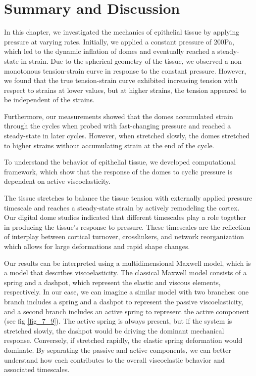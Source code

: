 \newpage
\hypertarget{summary}{%
	\section{Summary and Discussion}\label{summary}}

In this chapter, we investigated the mechanics of epithelial tissue by applying pressure at varying rates. Initially, we applied a constant pressure of 200Pa, which led to the dynamic inflation of domes and eventually reached a steady-state in strain. Due to the spherical geometry of the tissue, we observed a non-monotonous tension-strain curve in response to the constant pressure. However, we found that the true tension-strain curve exhibited increasing tension with respect to strains at lower values, but at higher strains, the tension appeared to be independent of the strains.

Furthermore, our measurements showed that the domes accumulated strain through the cycles when probed with fast-changing pressure and reached a steady-state in later cycles. However, when stretched slowly, the domes stretched to higher strains without accumulating strain at the end of the cycle.

To understand the behavior of epithelial tissue, we developed computational framework, which show that the response of the domes to cyclic pressure is dependent on active viscoelasticity.

The tissue stretches to balance the tissue tension with externally applied pressure timescale and reaches a steady-state strain by actively remodeling the cortex. Our digital dome studies indicated that different timescales play a role together in producing the tissue’s response to pressure. These timescales are the reflection of interplay between cortical turnover, crosslinkers, and network reorganization which allows for large deformations and rapid shape changes.

Our results can be interpreted using a multidimensional Maxwell model, which is a model that describes viscoelasticity. The classical Maxwell model consists of a spring and a dashpot, which represent the elastic and viscous elements, respectively. In our case, we can imagine a similar model with two branches: one branch includes a spring and a dashpot to represent the passive viscoelasticity, and a second branch includes an active spring to represent the active component  (see fig \ref{fig_7_9}). The active spring is always present, but if the system is stretched slowly, the dashpot would be driving the dominant mechanical response. Conversely, if stretched rapidly, the elastic spring deformation would dominate. By separating the passive and active components, we can better understand how each contributes to the overall viscoelastic behavior and associated timescales.

